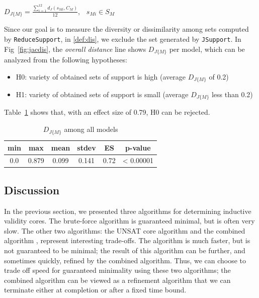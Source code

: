 \begin{definition}
  \label{def:dis}
  $D_{J\{M\}} =  \frac{\sum_{i=1}^{12}d_J(s_{Mi}, C_M)}{12},   \hspace{9pt} s_{Mi} \in S_M$
\end{definition}

Since our goal is to measure the diversity or dissimilarity among sets computed by \texttt{ReduceSupport}, in \ref{def:dis}, we exclude the set generated by \texttt{JSupport}. In Fig~\ref{fig:jacdis}, the \emph{overall distance} line shows $D_{J\{M\}}$ per model, which can be analyzed from the following hypotheses:
\begin{itemize}
  \item H0: variety of obtained sets of support is high (average $D_{J\{M\}}$ of 0.2)
  \item H1: variety of obtained sets of support is small (average $D_{J\{M\}}$ less than 0.2)
\end{itemize}
Table~\ref{tab:variety} shows that, with an effect size of 0.79, H0 can be rejected.
\begin{table}
  \centering
  \begin{tabular}{ |c|c|c|c|c|c| }
    \hline
     min & max & mean & stdev & ES & p-value\\[0.5ex]
    \hline
     0.0   & 0.879 & 0.099 & 0.141 & 0.72 & < 0.00001 \\[0.5ex]
    \hline
  \end{tabular}
  \caption{$D_{J\{M\}}$ among all models}
  \label{tab:variety}
\end{table}
\fi


\subsection{Discussion}

In the previous section, we presented three algorithms for determining
inductive validity cores. The brute-force algorithm is guaranteed
minimal, but is often very slow. The other two algorithms: the UNSAT
core algorithm \ucalg and the combined algorithm \ucbfalg, represent
interesting trade-offs. The \ucalg algorithm is much faster, but is
not guaranteed to be minimal; the result of this algorithm can be
further, and sometimes quickly, refined by the combined algorithm.
Thus, we can choose to trade off speed for guaranteed minimality using
these two algorithms; the combined algorithm can be viewed as a
refinement algorithm that we can terminate either at completion or
after a fixed time bound.


